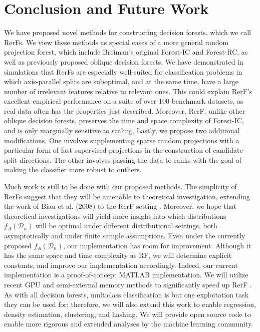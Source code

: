 \documentclass{article}
\providecommand{\mc}[1]{\mathcal{#1}}
\begin{document}
\section{Conclusion and Future Work}

We have proposed novel methods for constructing decision forests, which we call RerFs. We view these methods as special cases of a more general random projection forest, which include Breiman's original Forest-IC and Forest-RC, as well as previously proposed oblique decision forests. We have demonstrated in simulations that RerFs are especially well-suited for classification problems in which axis-parallel splits are suboptimal, and at the same time, have a large number of irrelevant features relative to relevant ones. This could explain RerF's excellent empirical performance on a suite of over 100 benchmark datasets, as real data often has the properties just described. Moreover, RerF, unlike other oblique decision forests, preserves the time and space complexity of Forest-IC, and is only marginally sensitive to scaling. Lastly, we propose two additional modifications. One involves supplementing sparse random projections with a particular form of fast supervised projections in the construction of candidate split directions. The other involves passing the data to ranks with the goal of making the classifier more robust to outliers.

Much work is still to be done with our proposed methods. The simplicity of RerFs suggest that they will be amenable to theoretical investigation, extending the work of Biau et al. (2008) to the RerF setting \cite{biau2008}. Moreover, we hope that theoretical investigations will yield more insight into which distributions $f_A(\mc{D}_n)$ will be optimal under different distributional settings, both asymptotically and under finite sample assumptions. Even under the currently proposed $f_A(\mc{D}_n)$, our implementation has room for improvement. Although it has the same space and time complexity as RF, we will determine explicit constants, and improve our implementation accordingly. Indeed, our current implementation is a proof-of-concept MATLAB implementation. We will utilize recent GPU and semi-external memory methods to significantly speed up RerF \cite{zheng15flashgraph}. As with all decision forests, multiclass classification is but one exploitation task they can be used for; therefore, we will also extend this work to enable regression, density estimation, clustering, and hashing. We will provide open source code to enable more rigorous and extended analyses by the machine learning community.




\end{document}
